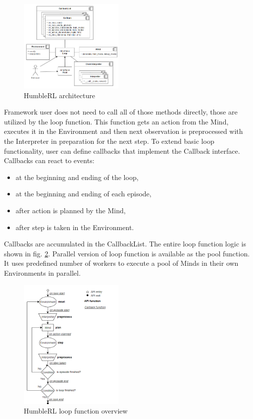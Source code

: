 \begin{figure}[H]
\includegraphics[width=0.45\textwidth,height=0.9\textheight,keepaspectratio]{figures/HumbleRL/architecture.png}
\caption{HumbleRL architecture}
\label{Fig.HRL_architecture}
\end{figure}

Framework user does not need to call all of those methods directly, those are utilized by the loop function. This function gets an action from the Mind, executes it in the Environment and then next observation is preprocessed with the Interpreter in preparation for the next step. To extend basic loop functionality, user can define callbacks that implement the Callback interface. Callbacks can react to events:
\begin{itemize}
\item at the beginning and ending of the loop,
\item at the beginning and ending of each episode,
\item after action is planned by the Mind,
\item after step is taken in the Environment.
\end{itemize}
Callbacks are accumulated in the CallbackList. The entire loop function logic is shown in fig. \ref{Fig.HRL_loop}.
Parallel version of loop function is available as the pool function. It uses predefined number of workers to execute a pool of Minds in their own Environments in parallel.

\begin{figure}[H]
\includegraphics[width=0.45\textwidth,height=0.9\textheight,keepaspectratio]{figures/HumbleRL/loop.png}
\caption{HumbleRL loop function overview}
\label{Fig.HRL_loop}
\end{figure}

